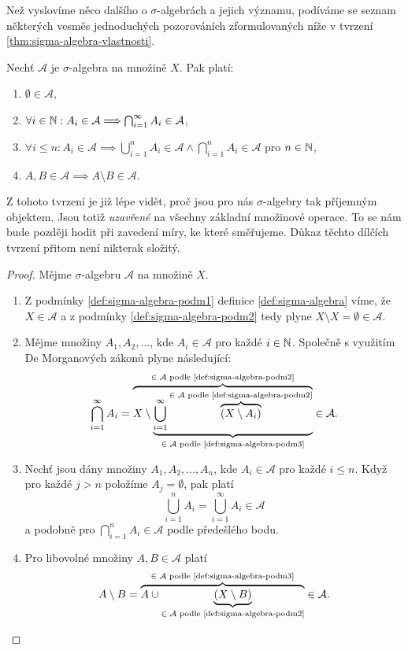 Než vyslovíme něco dalšího o $\sigma$-algebrách a jejich významu, podíváme se seznam některých vesměs jednoduchých pozorováních zformulovaných níže v tvrzení \ref{thm:sigma-algebra-vlastnosti}.
\begin{theorem}\label{thm:sigma-algebra-vlastnosti}
    Nechť $\mathcal{A}$ je $\sigma$-algebra na množině $X$. Pak platí:
    \begin{enumerate}[label=(\roman*)]
        \item $\emptyset\in\mathcal{A}$,
        \item $\forall i\in\mathbb{N}: A_i\in\mathcal{A}\Longrightarrow\bigcap_{i=1}^\infty A_i\in\mathcal{A}$,
        \item $\forall i\leqslant n: A_i\in\mathcal{A}\implies\bigcup_{i=1}^n A_i\in\mathcal{A}\land\bigcap_{i=1}^n A_i\in\mathcal{A}$ pro $n\in\mathbb{N}$,
        \item $A,B\in\mathcal{A}\implies A\setminus B\in\mathcal{A}$.
    \end{enumerate}
\end{theorem}

Z tohoto tvrzení je již lépe vidět, proč jsou pro nás $\sigma$-algebry tak příjemným objektem. Jsou totiž \emph{uzavřené} na všechny základní množinové operace. To se nám bude později hodit při zavedení míry, ke které směřujeme. Důkaz těchto dílčích tvrzení přitom není nikterak složitý.
\begin{proof}
    Mějme $\sigma$-algebru $\mathcal{A}$ na množině $X$.
    \begin{enumerate}[label=\textit{(\roman*)}]
        \item Z podmínky \ref{def:sigma-algebra-podm1} definice \ref{def:sigma-algebra} víme, že $X\in\mathcal{A}$ a z podmínky \ref{def:sigma-algebra-podm2} tedy plyne $X\setminus X=\emptyset\in\mathcal{A}$.
        \item Mějme množiny $A_1,A_2,\ldots$, kde $A_i\in\mathcal{A}$ pro každé $i\in\mathbb{N}$. Společně s využitím De Morganových zákonů plyne následující:
        \[\bigcap\limits_{i=1}^\infty A_i=\overbrace{X\setminus\underbrace{\bigcup\limits_{i=1}^\infty \overbrace{(X\setminus A_i)}^{\text{$\in\mathcal{A}$ podle \ref{def:sigma-algebra-podm2}}}}_{\text{$\in\mathcal{A}$ podle \ref{def:sigma-algebra-podm3}}}}^\text{$\in\mathcal{A}$ podle \ref{def:sigma-algebra-podm2}}\in\mathcal{A}.\]
        \item Nechť jsou dány množiny $A_1,A_2,\dots,A_n$, kde $A_i\in\mathcal{A}$ pro každé $i\leqslant n$. Když pro každé $j>n$ položíme $A_j=\emptyset$, pak platí
        \[\bigcup\limits_{i=1}^n A_i=\bigcup\limits_{i=1}^\infty A_i\in\mathcal{A}\]
        a podobně pro $\bigcap_{i=1}^n A_i\in\mathcal{A}$ podle předešlého bodu.
        \item Pro libovolné množiny $A,B\in\mathcal{A}$ platí
        \[A\setminus B=\overbrace{A\cup\underbrace{(X\setminus B)}_{\text{$\in\mathcal{A}$ podle \ref{def:sigma-algebra-podm2}}}}^{\text{$\in\mathcal{A}$ podle \ref{def:sigma-algebra-podm3}}}\in\mathcal{A}.\]
    \end{enumerate}
\end{proof}

